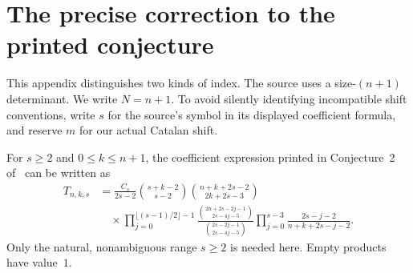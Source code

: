 \documentclass[11pt,a4paper]{article}
\numberwithin{equation}{section}
\theoremstyle{definition}
\theoremstyle{remark}
\begin{document}

\clearpage
\appendix
\section{The precise correction to the printed conjecture}\label{app:barry}

This appendix distinguishes two kinds of index.  The source uses a
size-$(n+1)$ determinant.  We write $N=n+1$.  To avoid silently
identifying incompatible shift conventions, write $s$ for the source's
symbol in its displayed coefficient formula, and reserve $m$ for
our actual Catalan shift.

For $s\geq2$ and $0\leq k\leq n+1$, the coefficient expression printed
in Conjecture~2 of~\cite{Barry2020} can be written as
\begin{align}
 T_{n,k,s}
 &=\frac{C_s}{2s-2}
   \binom{s+k-2}{s-2}\binom{n+k+2s-2}{2k+2s-3}\nonumber\\[-1pt]
 &\quad\times
  \prod_{j=0}^{\lfloor(s-1)/2\rfloor-1}
       \frac{\binom{2n+2s-2j-1}{2s-4j-5}}
            {\binom{2s-2j-1}{2s-4j-5}}
  \prod_{j=0}^{s-3}\frac{2s-j-2}{n+k+2s-j-2}.
 \label{eq:BarryT}
\end{align}
Only the natural, nonambiguous range $s\geq2$ is needed here.  Empty
products have value~$1$.
\end{document}
